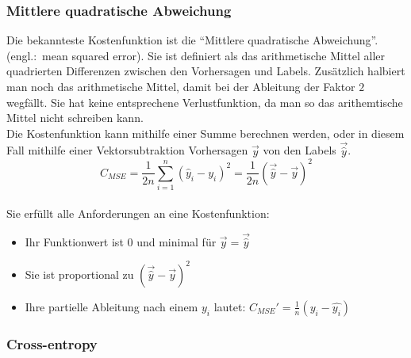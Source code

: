 \subsubsection{Mittlere quadratische Abweichung}
Die bekannteste Kostenfunktion ist die ``Mittlere quadratische Abweichung''.
(engl.:\ mean squared error). Sie ist definiert als das arithmetische Mittel
aller quadrierten Differenzen zwischen den Vorhersagen und Labels.
Zusätzlich halbiert man noch das arithmetische Mittel, damit bei der Ableitung der Faktor
$2$ wegfällt. Sie hat keine entsprechene Verlustfunktion, da man so das
arithemtische Mittel nicht schreiben kann.
\\
Die Kostenfunktion kann mithilfe einer Summe berechnen werden, oder in
diesem Fall mithilfe einer Vektorsubtraktion Vorhersagen $\vec{y}$ von den Labels $\vec{\hat{y}}$.
\\
\begin{equation}\label{eq:MSE}
  C_{MSE} = \frac{1}{2n}\sum_{i=1}^{n}{(\hat{y}_i - y_i)}^2 = \frac{1}{2n}{(\vec{\hat{y}} - \vec{y})}^2
\end{equation}
\\
Sie erfüllt alle Anforderungen an eine Kostenfunktion:
\begin{itemize}
\item{Ihr Funktionwert ist 0 und minimal für $\vec{y} = \vec{\hat{y}}$}
\item{Sie ist proportional zu ${(\vec{\hat{y}}-\vec{y})}^2$}
\item{Ihre partielle Ableitung nach einem $y_i$ lautet: $C_{MSE}'=\frac{1}{n}(y_i-\hat{y_i})$}
\end{itemize}


\subsubsection{Cross-entropy}


